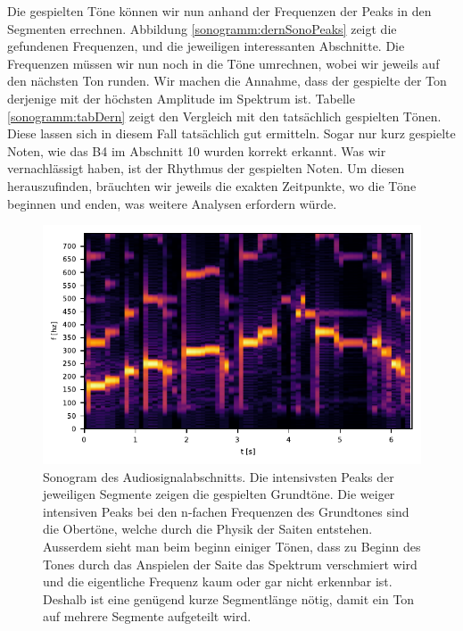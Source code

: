 Die gespielten Töne können wir nun anhand der Frequenzen 
der Peaks in den Segmenten errechnen.
Abbildung \ref{sonogramm:dernSonoPeaks} zeigt die gefundenen Frequenzen, und die
jeweiligen interessanten Abschnitte.
Die Frequenzen müssen wir nun noch in die Töne umrechnen, wobei wir jeweils auf den
nächsten Ton runden.
Wir machen die Annahme, dass der gespielte der Ton derjenige mit der höchsten Amplitude im Spektrum 
ist. 
Tabelle \ref{sonogramm:tabDern} zeigt den Vergleich mit den tatsächlich gespielten Tönen.
Diese lassen sich in diesem Fall tatsächlich gut ermitteln.
Sogar nur kurz gespielte Noten, wie das B4 im Abschnitt 10 
wurden korrekt erkannt.
Was wir vernachlässigt haben, ist der Rhythmus der gespielten Noten.
Um diesen herauszufinden, bräuchten wir jeweils die exakten Zeitpunkte, wo die Töne
beginnen und enden, was weitere Analysen erfordern würde.

\begin{figure}
    \centering
    \includegraphics{papers/sonogramm/images/dernSono1.pdf}
    \caption{Sonogram des Audiosignalabschnitts. Die intensivsten Peaks der 
    jeweiligen Segmente zeigen die gespielten Grundtöne. Die weiger
    intensiven Peaks bei den n-fachen Frequenzen des Grundtones sind die Obertöne, welche durch die Physik der Saiten 
    entstehen.
    Ausserdem sieht man beim beginn einiger Tönen, dass zu Beginn des Tones durch das Anspielen der Saite das Spektrum verschmiert wird
    und die eigentliche Frequenz kaum oder gar nicht erkennbar ist.
    Deshalb ist eine genügend kurze Segmentlänge nötig, damit ein Ton auf mehrere Segmente aufgeteilt wird.
    \label{sonogramm:dernSono}
    }
\end{figure}

